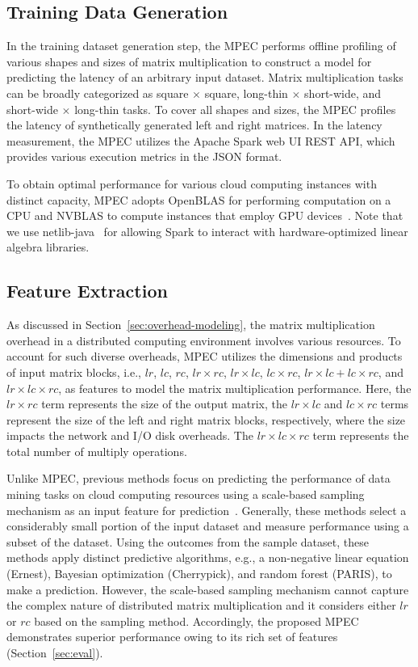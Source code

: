 \documentclass[10pt, conference, compsocconf]{IEEEtran}
\begin{document}
\subsection{Training Data Generation}\label{sec:train-data}
In the training dataset generation step, the MPEC performs offline profiling of various shapes and sizes of matrix multiplication to construct a model for predicting the latency of an arbitrary input dataset. Matrix multiplication tasks can be broadly categorized as  square $\times$ square, long-thin $\times$ short-wide, and short-wide $\times$ long-thin tasks. To cover all shapes and sizes, the MPEC profiles the latency of synthetically generated left and right matrices. In the latency measurement, the MPEC utilizes the Apache Spark web UI REST API, which provides various execution metrics in the JSON format.

To obtain optimal performance for various cloud computing instances with distinct capacity, MPEC adopts OpenBLAS for performing computation on a CPU and NVBLAS to compute instances that employ GPU devices~\cite{NVBLAS}. Note that we use netlib-java~\cite{fatman-littleboy} for allowing Spark to interact with hardware-optimized linear algebra libraries.

\subsection{Feature Extraction}\label{sec:features}
As discussed in Section~\ref{sec:overhead-modeling}, the matrix multiplication overhead in a distributed computing environment involves various resources. To account for such diverse overheads, MPEC utilizes the dimensions and products of input matrix blocks, i.e., $lr$, $lc$, $rc$, $lr \times rc$, $lr \times lc$, $lc \times rc$, $lr \times lc + lc \times rc$, and $lr \times lc \times rc$, as features to model the matrix multiplication performance. Here, the $lr \times rc$ term represents the size of the output matrix, the $lr \times lc$ and $lc \times rc$ terms represent the size of the left and right matrix blocks, respectively, where the size impacts the network and I/O disk overheads. The $lr \times lc \times rc$ term represents the total number of multiply operations.

Unlike MPEC, previous methods focus on predicting the performance of data mining tasks on cloud computing resources using a scale-based sampling mechanism as an input feature for prediction~\cite{cherrypick, ernest, paris}. Generally, these methods select a considerably small portion of the input dataset and measure performance using a subset of the dataset. Using the outcomes from the sample dataset, these methods apply distinct predictive algorithms, e.g., a non-negative linear equation (Ernest), Bayesian optimization (Cherrypick), and random forest (PARIS), to make a prediction. However, the scale-based sampling mechanism cannot capture the complex nature of distributed matrix multiplication and it considers either $lr$ or $rc$ based on the sampling method. Accordingly, the proposed MPEC demonstrates superior performance owing to its rich set of features (Section~\ref{sec:eval}).
\end{document}
